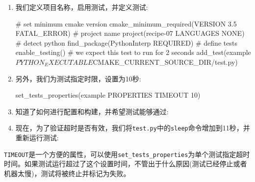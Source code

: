 \begin{enumerate}
\item 我们定义项目名称，启用测试，并定义测试:

\begin{codebox}[cmake]
# set minimum cmake version
cmake_minimum_required(VERSION 3.5 FATAL_ERROR)
# project name
project(recipe-07 LANGUAGES NONE)
# detect python
find_package(PythonInterp REQUIRED)
# define tests
enable_testing()
# we expect this test to run for 2 seconds
add_test(example ${PYTHON_EXECUTABLE} ${CMAKE_CURRENT_SOURCE_DIR}/test.py)
\end{codebox}

\item 另外，我们为测试指定时限，设置为10秒:

\begin{codebox}[cmake]
set_tests_properties(example PROPERTIES TIMEOUT 10)
\end{codebox}

\item 知道了如何进行配置和构建，并希望测试能够通过:


\item 现在，为了验证超时是否有效，我们将\texttt{test.py}中的\texttt{sleep}命令增加到11秒，并重新运行测试:


\end{enumerate}


\texttt{TIMEOUT}是一个方便的属性，可以使用\texttt{set\_tests\_properties}为单个测试指定超时时间。如果测试运行超过了这个设置时间，不管出于什么原因(测试已经停止或者机器太慢)，测试将被终止并标记为失败。


